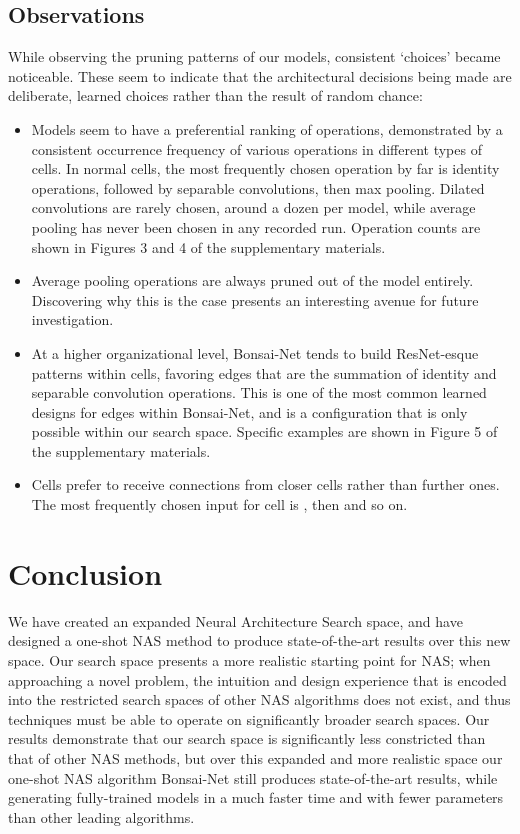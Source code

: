 \documentclass[10pt,twocolumn,letterpaper]{article}
\begin{document}
\subsection{Observations} 
While observing the pruning patterns of our models, consistent `choices' became noticeable. These seem to indicate that the architectural decisions being made are deliberate, learned choices rather than the result of random chance:
\begin{itemize}
\setlength\itemsep{0em}
\item Models seem to have a preferential ranking of operations, demonstrated by a consistent occurrence frequency of various operations in different types of cells. In normal cells, the most frequently chosen operation by far is identity operations, followed by separable convolutions, then max pooling. Dilated convolutions are rarely chosen, around a dozen per model, while average pooling has never been chosen in any recorded run. Operation counts are shown in Figures 3 and 4 of the supplementary materials.
\item Average pooling operations are always pruned out of the model entirely. Discovering why this is the case presents an interesting avenue for future investigation.
\item At a higher organizational level, Bonsai-Net tends to build ResNet-esque \cite{he2015} patterns within cells, favoring edges that are the summation of identity and separable convolution operations. This is one of the most common learned designs for edges within Bonsai-Net, and is a configuration that is only possible within our search space. Specific examples are shown in Figure 5 of the  supplementary materials.
\item Cells prefer to receive connections from closer cells rather than further ones. The most frequently chosen input for cell  is , then  and so on. 
\end{itemize}
 
\section{Conclusion}
We have created an expanded Neural Architecture Search space, and have designed a one-shot NAS method to produce state-of-the-art results over this new space. Our search space presents a more realistic starting point for NAS; when approaching a novel problem, the intuition and design experience that is encoded into the restricted search spaces of other NAS algorithms does not exist, and thus techniques must be able to operate on significantly broader search spaces. Our results demonstrate that our search space is significantly less constricted than that of other NAS methods, but over this expanded and more realistic space our one-shot NAS algorithm Bonsai-Net still produces state-of-the-art results, while generating fully-trained models in a much faster time and with fewer parameters than other leading algorithms.
{\small


}
\newpage



\end{document}
